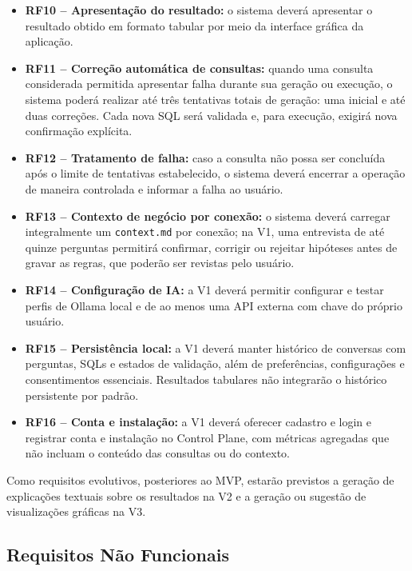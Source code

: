 \begin{itemize}
    \item \textbf{RF10 -- Apresentação do resultado:}
    o sistema deverá apresentar o resultado obtido em formato tabular por meio da interface gráfica da aplicação.

    \item \textbf{RF11 -- Correção automática de consultas:}
    quando uma consulta considerada permitida apresentar falha durante sua geração ou execução, o sistema poderá realizar até três tentativas totais de geração: uma inicial e até duas correções. Cada nova SQL será validada e, para execução, exigirá nova confirmação explícita.

    \item \textbf{RF12 -- Tratamento de falha:}
    caso a consulta não possa ser concluída após o limite de tentativas estabelecido, o sistema deverá encerrar a operação de maneira controlada e informar a falha ao usuário.


    \item \textbf{RF13 -- Contexto de negócio por conexão:}
    o sistema deverá carregar integralmente um \texttt{context.md} por conexão; na V1, uma entrevista de até quinze perguntas permitirá confirmar, corrigir ou rejeitar hipóteses antes de gravar as regras, que poderão ser revistas pelo usuário.

    \item \textbf{RF14 -- Configuração de IA:}
    a V1 deverá permitir configurar e testar perfis de Ollama local e de ao menos uma API externa com chave do próprio usuário.

    \item \textbf{RF15 -- Persistência local:}
    a V1 deverá manter histórico de conversas com perguntas, SQLs e estados de validação, além de preferências, configurações e consentimentos essenciais. Resultados tabulares não integrarão o histórico persistente por padrão.

    \item \textbf{RF16 -- Conta e instalação:}
    a V1 deverá oferecer cadastro e login e registrar conta e instalação no Control Plane, com métricas agregadas que não incluam o conteúdo das consultas ou do contexto.

\end{itemize}

Como requisitos evolutivos, posteriores ao MVP, estarão previstos a geração de explicações textuais sobre os resultados na V2 e a geração ou sugestão de visualizações gráficas na V3.


\subsection{Requisitos Não Funcionais}

